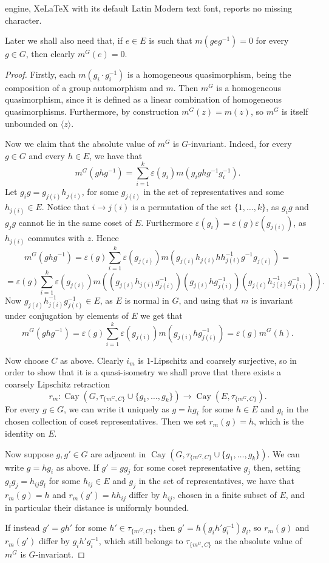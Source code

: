 \documentclass[10pt,a4paper]{amsart}
\newcommand{\Cay}[2]{\operatorname{Cay}\left(#1,#2\right)}
\begin{document}
engine, XeLaTeX with its default Latin Modern text font, reports no missing character.
\begin{rem}\label{rem:mG_trivial_on_adjacent_Zw}
    Later we shall also need that, if $e\in E$ is such that $m(geg^{-1})=0$ for every $g\in G$, then clearly $m^G(e)=0$. 
\end{rem}

\begin{proof}
Firstly, each $m(g_i \cdot g_i^{-1})$ is a homogeneous quasimorphism, being the composition of a group automorphism and $m$. Then $m^G$ is a homogeneous quasimorphism, since it is defined as a linear combination of homogeneous quasimorphisms. Furthermore, by construction $m^G(z)=m(z)$, so $m^G$ is itself unbounded on $\langle z\rangle$.


Now we claim that the absolute value of $m^G$ is $G$-invariant. Indeed, for every $g\in G$ and every $h\in E$, we have that
$$m^G(g h g^{-1})=\sum_{i=1}^k\varepsilon(g_i) m(g_ighg^{-1}g_i^{-1}).$$
Let $g_ig=g_{j(i)} h_{j(i)}$, for some $g_{j(i)}$ in the set of representatives and some $h_{j(i)}\in E$. Notice that $i\to j(i)$ is a permutation of the set $\{1, \ldots, k\}$, as $g_ig$ and $g_jg$ cannot lie in the same coset of $E$. Furthermore $\varepsilon(g_i)=\varepsilon(g)\varepsilon(g_{j(i)})$, as $h_{j(i)}$ commutes with $z$. Hence
$$m^G(g h g^{-1})=\varepsilon(g)\sum_{i=1}^k\varepsilon(g_{j(i)}) m(g_{j(i)}h_{j(i)}hh_{j(i)}^{-1}g^{-1}g_{j(i)})=$$
$$=\varepsilon(g)\sum_{i=1}^k\varepsilon(g_{j(i)}) m\left((g_{j(i)}h_{j(i)}g_{j(i)}^{-1})(g_{j(i)}hg_{j(i)}^{-1})(g_{j(i)}h_{j(i)}^{-1}g_{j(i)}^{-1})\right).$$
Now $g_{j(i)}h_{j(i)}^{-1}g_{j(i)}^{-1}\in E$, as $E$ is normal in $G$, and using that $m$ is invariant under conjugation by elements of $E$ we get that
$$m^G(g h g^{-1})=\varepsilon(g)\sum_{i=1}^k\varepsilon(g_{j(i)}) m\left(g_{j(i)}hg_{j(i)}^{-1}\right)=\varepsilon(g)m^G(h).$$



Now choose $C$ as above. Clearly $i_m$ is $1$-Lipschitz and coarsely surjective, so in order to show that it is a quasi-isometry we shall prove that there exists a coarsely Lipschitz retraction 
$$r_m\colon \Cay{G}{\tau_{\{m^G,C\}}\cup\{g_1,\ldots, g_k\}}\to \Cay{E}{\tau_{\{m^G,C\}}}.$$
For every $g\in G$, we can write it uniquely as $g=hg_i$ for some $h\in E$ and $g_i$ in the chosen collection of coset representatives. Then we set $r_m(g)=h$, which is the identity on $E$. 

Now suppose $g, g'\in G$ are adjacent in $\Cay{G}{\tau_{\{m^G,C\}}\cup\{g_1,\ldots, g_k\}}$. We can write $g=hg_i$ as above. If $g'=gg_j$ for some coset representative $g_j$ then, setting $g_ig_j=h_{ij}g_{l}$ for some $h_{ij}\in E$ and $g_j$ in the set of representatives, we have that $r_m(g)=h$ and $r_m(g')=hh_{ij}$ differ by $h_{ij}$, chosen in a finite subset of $E$, and in particular their distance is uniformly bounded.

If instead $g'=gh'$ for some $h'\in \tau_{\{m^G,C\}}$, then $g'=h(g_i h' g_i^{-1}) g_i$, so $r_m(g)$ and $r_m(g')$ differ by $g_i h' g_i^{-1}$, which still belongs to $\tau_{\{m^G,C\}}$ as the absolute value of $m^G$ is $G$-invariant.
\end{proof}
\end{document}
